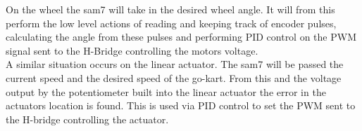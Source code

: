 On the wheel the sam7 will take in the desired wheel angle. It will from this perform the low level actions of reading and keeping track of encoder pulses, calculating the angle from these pulses and performing PID control on the PWM signal sent to the H-Bridge controlling the motors voltage.\\
A similar situation occurs on the linear actuator. The sam7 will be passed the current speed and the desired speed of the go-kart. From this and the voltage output by the potentiometer built into the linear actuator the error in the actuators location is found. This is used via PID control to set the PWM sent to the H-bridge controlling the actuator.\\